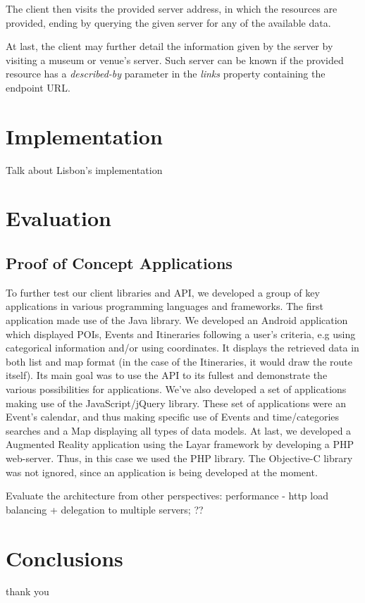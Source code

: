 \documentclass[times]{ettauth}
\begin{document}
The client then visits the provided server address, in which the resources are provided, ending by querying the given server for any of the available data. 

At last, the client may further detail the information given by the server by visiting a museum or venue's server. Such server can be known if the provided resource has a \textit{described-by} parameter in the \textit{links} property containing the endpoint URL.

\section{Implementation}
Talk about Lisbon's implementation



\section{Evaluation}

\subsection{Proof of Concept Applications}
To further test our client libraries and API, we developed a group of key applications in various programming languages and frameworks.
The first application made use of the Java library. We developed an Android application which displayed \acp{POI}, Events and Itineraries following a user's criteria, e.g using categorical information and/or using coordinates. It displays the retrieved data in both list and map format (in the case of the Itineraries, it would draw the route itself). Its main goal was to use the API to its fullest and demonstrate the various possibilities for applications.
We've also developed a set of applications making use of the JavaScript/jQuery library. These set of applications were an Event's calendar, and thus making specific use of Events and time/categories searches and a Map displaying all types of data models.
At last, we developed a Augmented Reality application using the Layar framework by developing a PHP web-server. Thus, in this case we used the PHP library.
The Objective-C library was not ignored, since an application is being developed at the moment.

Evaluate the architecture from other perspectives: performance - http load balancing + delegation to multiple servers; ??



\section{Conclusions}


\acks
thank you



\end{document}
